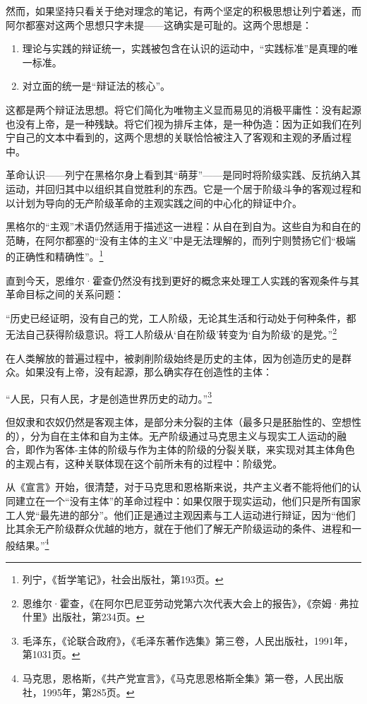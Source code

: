 \documentclass[fontset=fandol, a4paper, 12pt, twoside]{ctexart}
\renewenvironment{quote}
  {\list{}{\rightmargin=0cm \leftmargin=2em}%
   \item\relax\small\kaishu\color{black}}
  {\endlist}
\begin{document}
然而，如果坚持只看关于绝对理念的笔记，有两个坚定的积极思想让列宁着迷，而阿尔都塞对这两个思想只字未提——这确实是可耻的。这两个思想是：

\begin{enumerate}
    \item 理论与实践的辩证统一，实践被包含在认识的运动中，“实践标准”是真理的唯一标准。
    \item 对立面的统一是“辩证法的核心”。
\end{enumerate}

这都是两个辩证法思想。将它们简化为唯物主义显而易见的消极平庸性：没有起源也没有上帝，是一种残缺。将它们视为排斥主体，是一种伪造：因为正如我们在列宁自己的文本中看到的，这两个思想的关联恰恰被注入了客观和主观的矛盾过程中。

革命认识——列宁在黑格尔身上看到其“萌芽”——是同时将阶级实践、反抗纳入其运动，并回归其中以组织其自觉胜利的东西。它是一个居于阶级斗争的客观过程和以计划为导向的无产阶级革命的主观实践之间的中心化的辩证中介。

黑格尔的“主观”术语仍然适用于描述这一进程：从自在到自为。这些自为和自在的范畴，在阿尔都塞的“没有主体的主义”中是无法理解的，而列宁则赞扬它们“极端的正确性和精确性”。\footnote{列宁，《哲学笔记》，社会出版社，第193页。}

直到今天，恩维尔·霍查仍然没有找到更好的概念来处理工人实践的客观条件与其革命目标之间的关系问题：

\begin{quote}
“历史已经证明，没有自己的党，工人阶级，无论其生活和行动处于何种条件，都无法自己获得阶级意识。将工人阶级从‘自在阶级’转变为‘自为阶级’的是党。”\footnote{恩维尔·霍查，《在阿尔巴尼亚劳动党第六次代表大会上的报告》，《奈姆·弗拉什里》出版社，第234页。}
\end{quote}

在人类解放的普遍过程中，被剥削阶级始终是历史的主体，因为创造历史的是群众。如果没有上帝，没有起源，那么确实存在创造性的主体：

\begin{quote}
“人民，只有人民，才是创造世界历史的动力。”\footnote{毛泽东，《论联合政府》，《毛泽东著作选集》第三卷，人民出版社，1991年，第1031页。}
\end{quote}

但奴隶和农奴仍然是客观主体，是部分未分裂的主体（最多只是胚胎性的、空想性的），分为自在主体和自为主体。无产阶级通过马克思主义与现实工人运动的融合，即作为客体-主体的阶级与作为主体的阶级的分裂关联，来实现对其主体角色的主观占有，这种关联体现在这个前所未有的过程中：阶级党。

从《宣言》开始，很清楚，对于马克思和恩格斯来说，共产主义者不能将他们的认同建立在一个“没有主体”的革命过程中：如果仅限于现实运动，他们只是所有国家工人党“最先进的部分”。他们正是通过主观因素与工人运动进行辩证，因为“他们比其余无产阶级群众优越的地方，就在于他们了解无产阶级运动的条件、进程和一般结果。”\footnote{马克思，恩格斯，《共产党宣言》，《马克思恩格斯全集》第一卷，人民出版社，1995年，第285页。}
\end{document}
